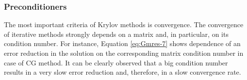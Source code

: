 










\subsubsection{Preconditioners}
\label{subseq:iterative-preconditioners}
The most important criteria of Krylov methods is convergence. The convergence of iterative methods strongly depends on a matrix and, in particular, on its condition number. For instance, Equation \ref{eq:Gmres-7} shows dependence of an error reduction in the solution on the corresponding matrix condition number in case of CG method. It can be clearly observed that a big condition number results in a very slow error reduction and, therefore, in a slow convergence rate.\\


